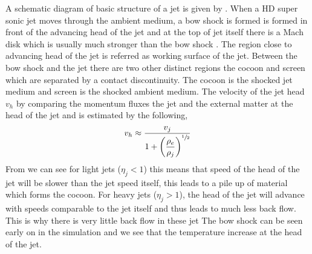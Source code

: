 \par A schematic diagram of basic structure of a jet is given by . When a HD super sonic jet moves through the ambient medium, a bow shock is formed is formed in front of the advancing head of the jet and at the top of jet itself there is a Mach disk which is usually much stronger than the bow shock \citep{Chakrabarti1988}. The region close to advancing head of the jet is referred as working surface of the jet. Between the bow shock and the jet there are two other distinct regions the cocoon and screen which are separated by a contact discontinuity. The cocoon is the shocked jet medium and screen is the shocked ambient medium. The velocity of the jet head $v_h$ by comparing the momentum fluxes the jet and the external matter at the head of the jet and is estimated by the following,
\begin{equation}\label{v_j_speed}
v_h \approx \dfrac{v_j}{1+ \left( \dfrac{\rho_e}{\rho_j} \right)^{\sfrac{1}{2}}} 
\end{equation}
From  we can see for light jets ($\eta_j<1$) this means that speed of the head of the jet will be slower than the jet speed itself, this leads to a pile up of material which forms the cocoon. For heavy jets ($\eta_j>1$), the head of the jet will advance with speeds comparable to the jet itself and thus leads to much less back flow. This is why there is very little back flow in these jet The bow shock can be seen early on in the simulation and we see that the temperature increase at the head of the jet.
